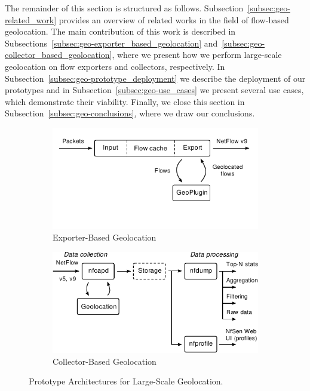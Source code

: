 The remainder of this section is structured as follows. Subsection~\ref{subsec:geo-related_work} provides an overview of related works in the field of flow-based geolocation. The main contribution of this work is described in Subsections~\ref{subsec:geo-exporter_based_geolocation} and~\ref{subsec:geo-collector_based_geolocation}, where we present how we perform large-scale geolocation on flow exporters and collectors, respectively. In Subsection~\ref{subsec:geo-prototype_deployment} we describe the deployment of our prototypes and in Subsection~\ref{subsec:geo-use_cases} we present several use cases, which demonstrate their viability. Finally, we close this section in Subsection~\ref{subsec:geo-conclusions}, where we draw our conclusions.

\begin{figure}[!tb]
    \centering
    \begin{subfigure}[t]{0.5\textwidth}
        \includegraphics[width=\textwidth]{figures/paper-geolocation/exporter-arch}
        \caption{Exporter-Based Geolocation}
        \label{fig:geo-exporter-arch}
    \end{subfigure}%
    \begin{subfigure}[t]{0.5\textwidth}
        \includegraphics[width=\textwidth] {figures/paper-geolocation/collector-arch}
        \caption{Collector-Based Geolocation}
        \label{fig:geo-collector-arch}
    \end{subfigure}
    \caption{Prototype Architectures for Large-Scale Geolocation.}
    \label{fig:geo-architecture}
\end{figure}

